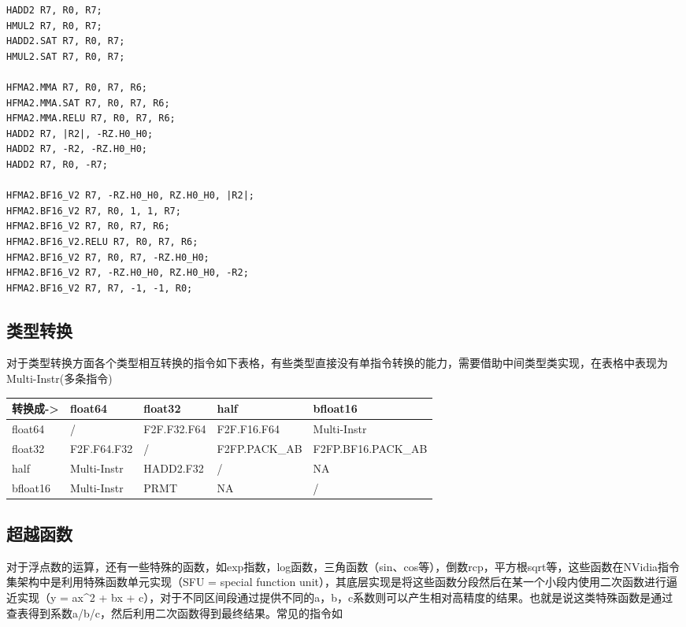 \begin{lstlisting}
HADD2 R7, R0, R7;
HMUL2 R7, R0, R7;
HADD2.SAT R7, R0, R7;
HMUL2.SAT R7, R0, R7;

HFMA2.MMA R7, R0, R7, R6;
HFMA2.MMA.SAT R7, R0, R7, R6;
HFMA2.MMA.RELU R7, R0, R7, R6;
HADD2 R7, |R2|, -RZ.H0_H0;
HADD2 R7, -R2, -RZ.H0_H0;
HADD2 R7, R0, -R7;

HFMA2.BF16_V2 R7, -RZ.H0_H0, RZ.H0_H0, |R2|;
HFMA2.BF16_V2 R7, R0, 1, 1, R7;
HFMA2.BF16_V2 R7, R0, R7, R6;
HFMA2.BF16_V2.RELU R7, R0, R7, R6;
HFMA2.BF16_V2 R7, R0, R7, -RZ.H0_H0;
HFMA2.BF16_V2 R7, -RZ.H0_H0, RZ.H0_H0, -R2;
HFMA2.BF16_V2 R7, R7, -1, -1, R0;
\end{lstlisting}

\subsection{类型转换}

对于类型转换方面各个类型相互转换的指令如下表格，有些类型直接没有单指令转换的能力，需要借助中间类型类实现，在表格中表现为Multi-Instr(多条指令)

\begin{table}[htbp]
\centering
\begin{tabular}{lllll}
\toprule
转换成-\textgreater{} & float64 & float32 & half & bfloat16 \\
\midrule
float64 & / & F2F.F32.F64 & F2F.F16.F64 & Multi-Instr \\
float32 & F2F.F64.F32 & / & F2FP.PACK\_AB & F2FP.BF16.PACK\_AB \\
half & Multi-Instr & HADD2.F32 & / & NA \\
bfloat16 & Multi-Instr & PRMT & NA & / \\
\bottomrule
\end{tabular}
\end{table}

\subsection{超越函数}

对于浮点数的运算，还有一些特殊的函数，如exp指数，log函数，三角函数（sin、cos等），倒数rcp，平方根sqrt等，这些函数在NVidia指令集架构中是利用特殊函数单元实现（SFU = special function unit），其底层实现是将这些函数分段然后在某一个小段内使用二次函数进行逼近实现（y = ax\textasciicircum{}2 + bx + c），对于不同区间段通过提供不同的a，b，c系数则可以产生相对高精度的结果。也就是说这类特殊函数是通过查表得到系数a/b/c，然后利用二次函数得到最终结果。常见的指令如

